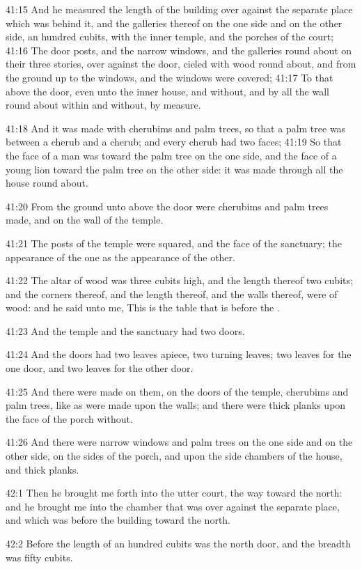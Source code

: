 41:15 And he measured the length of the building over against the
separate place which was behind it, and the galleries thereof on the
one side and on the other side, an hundred cubits, with the inner
temple, and the porches of the court; 41:16 The door posts, and the
narrow windows, and the galleries round about on their three stories,
over against the door, cieled with wood round about, and from the
ground up to the windows, and the windows were covered; 41:17 To that
above the door, even unto the inner house, and without, and by all the
wall round about within and without, by measure.

41:18 And it was made with cherubims and palm trees, so that a palm
tree was between a cherub and a cherub; and every cherub had two
faces; 41:19 So that the face of a man was toward the palm tree on the
one side, and the face of a young lion toward the palm tree on the
other side: it was made through all the house round about.

41:20 From the ground unto above the door were cherubims and palm
trees made, and on the wall of the temple.

41:21 The posts of the temple were squared, and the face of the
sanctuary; the appearance of the one as the appearance of the other.

41:22 The altar of wood was three cubits high, and the length thereof
two cubits; and the corners thereof, and the length thereof, and the
walls thereof, were of wood: and he said unto me, This is the table
that is before the \LORD.

41:23 And the temple and the sanctuary had two doors.

41:24 And the doors had two leaves apiece, two turning leaves; two
leaves for the one door, and two leaves for the other door.

41:25 And there were made on them, on the doors of the temple,
cherubims and palm trees, like as were made upon the walls; and there
were thick planks upon the face of the porch without.

41:26 And there were narrow windows and palm trees on the one side and
on the other side, on the sides of the porch, and upon the side
chambers of the house, and thick planks.

42:1 Then he brought me forth into the utter court, the way toward the
north: and he brought me into the chamber that was over against the
separate place, and which was before the building toward the north.

42:2 Before the length of an hundred cubits was the north door, and
the breadth was fifty cubits.


